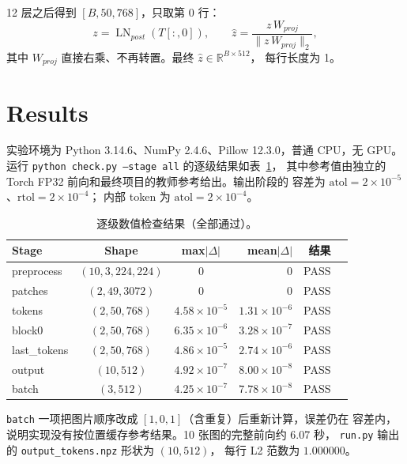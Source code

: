 \documentclass[a4paper,12pt]{article}
\begin{document}
12 层之后得到 $[B,50,768]$，只取第 0 行：
\begin{equation}
z=\operatorname{LN}_{post}\!\left(T[:,0]\right),\qquad
\hat z=\frac{z\,W_{proj}}{\lVert z\,W_{proj}\rVert_2},
\end{equation}
其中 $W_{proj}$ 直接右乘、不再转置。最终 $\hat z\in\mathbb{R}^{B\times512}$，
每行长度为 1。

\section{Results}

实验环境为 Python 3.14.6、NumPy 2.4.6、Pillow 12.3.0，普通 CPU，无 GPU。
运行 \texttt{python check.py --stage all} 的逐级结果如表~\ref{tab:errors}，
其中参考值由独立的 Torch FP32 前向和最终项目的教师参考给出。输出阶段的
容差为 $\mathrm{atol}=2\times10^{-5}$、$\mathrm{rtol}=2\times10^{-4}$；
内部 token 为 $\mathrm{atol}=2\times10^{-4}$。

\begin{table}[H]
\centering
\small
\renewcommand{\arraystretch}{1.12}
\begin{tabular}{lccrrl}
\toprule
Stage & Shape & max$|\Delta|$ & mean$|\Delta|$ & 结果 \\
\midrule
preprocess  & $(10,3,224,224)$ & $0$            & $0$            & PASS \\
patches     & $(2,49,3072)$    & $0$            & $0$            & PASS \\
tokens      & $(2,50,768)$     & $4.58\times10^{-5}$ & $1.31\times10^{-6}$ & PASS \\
block0      & $(2,50,768)$     & $6.35\times10^{-6}$ & $3.28\times10^{-7}$ & PASS \\
last\_tokens& $(2,50,768)$     & $4.86\times10^{-5}$ & $2.74\times10^{-6}$ & PASS \\
output      & $(10,512)$       & $4.92\times10^{-7}$ & $8.00\times10^{-8}$ & PASS \\
batch       & $(3,512)$        & $4.25\times10^{-7}$ & $7.78\times10^{-8}$ & PASS \\
\bottomrule
\end{tabular}
\caption{逐级数值检查结果（全部通过）。}
\label{tab:errors}
\end{table}

\texttt{batch} 一项把图片顺序改成 $[1,0,1]$（含重复）后重新计算，误差仍在
容差内，说明实现没有按位置缓存参考结果。10 张图的完整前向约 6.07 秒，
\texttt{run.py} 输出的 \texttt{output\_tokens.npz} 形状为 $(10,512)$，
每行 L2 范数为 $1.000000$。
\end{document}

